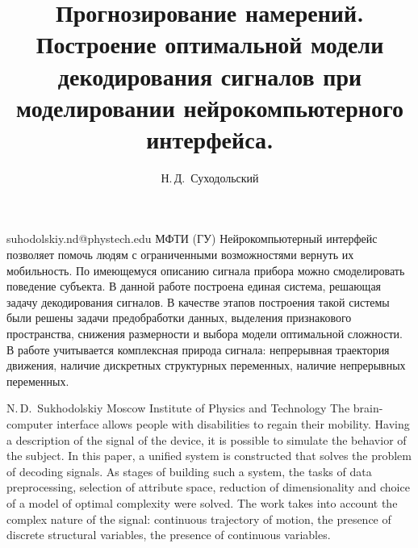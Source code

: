 \documentclass[12pt,twoside]{article}
\begin{document}
\title
    {Прогнозирование намерений. Построение оптимальной модели декодирования сигналов при моделировании нейрокомпьютерного интерфейса.}
\author
    {Н.\,Д.~Суходольский} 
\email
    {suhodolskiy.nd@phystech.edu}
\organization
    {МФТИ (ГУ)}
\abstract
    {Нейрокомпьютерный интерфейс позволяет помочь людям с ограниченными возможностями вернуть их мобильность. По имеющемуся описанию сигнала прибора можно смоделировать поведение субъекта. В данной работе построена единая система, решающая задачу декодирования сигналов. В качестве этапов построения такой системы были решены задачи предобработки данных, выделения признакового пространства, снижения размерности и выбора модели оптимальной сложности. В работе учитывается комплексная природа сигнала: непрерывная траектория движения, наличие дискретных структурных переменных, наличие непрерывных переменных.}

\authorEng
    {N.\,D.~Sukhodolskiy}
\organizationEng
    {Moscow Institute of Physics and Technology}
\abstractEng
    {The brain-computer interface allows people with disabilities to regain their mobility. Having a description of the signal of the device, it is possible to simulate the behavior of the subject. In this paper, a unified system is constructed that solves the problem of decoding signals. As stages of building such a system, the tasks of data preprocessing, selection of attribute space, reduction of dimensionality and choice of a model of optimal complexity were solved. The work takes into account the complex nature of the signal: continuous trajectory of motion, the presence of discrete structural variables, the presence of continuous variables.}

\maketitle
\end{document}
